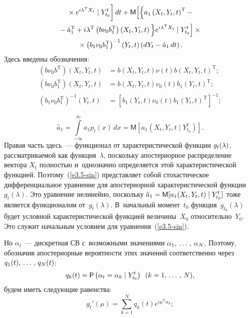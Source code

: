 \begin{multicols}{2}
\begin{multline}
\left.{}\times
    e^{i\lambda^{\mathrm{T}} X_t}\mid Y_{t_0}^t
    \vphantom{\fr{1}{2}}
    \right] dt+ \mathsf{M} \Big[ \Big\{ 
    a_1 \left(X_t,Y_t,t\right)^{\mathrm{T}} -{}\\
    {}-{\hat a}_1^{\mathrm{T}} +i\lambda^{\mathrm{T}} \left(b\nu_0 b^{\mathrm{T}}_1\right)
    \left(X_t,Y_t,t\right)\Big\} e^{i\lambda^{\mathrm{T}} X_t}\mid
    Y_{t_0}^t\Big] \times{}\\
    {}\times \left(b_1\nu_0 b_1^{\mathrm{T}}\right)^{-1} (Y_t,t) \left(dY_t-{\hat a}_1
    \,dt\right).\label{e3.5-sin}
    \end{multline}
Здесь введены обозначения:
\begin{align*}
\left(b\nu_0 b^{\mathrm{T}}\right)\left(X_t,Y_t,t\right)& = b\left(X_t,Y_t,t\right) \nu(t) b\left(X_t,Y_t,t\right)^{\mathrm{T}};\\
     \left(b\nu_0 b_1^{\mathrm{T}}\right) \left(X_t,Y_t,t\right) &=b\left(X_t,Y_t,t\right) \nu_0(t)
    b_1 \left(Y_t,t\right)^{\mathrm{T}};
    \\
     \left(b_1\nu_0 b_1^{\mathrm{T}}\right)^{-1} \left(Y_t,t\right) &=\left[b_1 \left(Y_t,t\right) \nu_0(t)
    b_1\left(Y_t,t\right)^{\mathrm{T}}\right]^{-1};
   \end{align*}
   
   \vspace*{-9pt}
   
\noindent
   $$
    {\hat a}_1 =\int\limits_{-\infty}^\infty a_1 p_t (x) \,dx= \mathsf{M}\left[a_1 \left(X_t, Y_t,t\mid
    Y_{t_0}^t\right)\right].
$$
Правая часть здесь~--- функционал от характеристической функции
$g_t(\lambda)$, рассматриваемой как функция~$\lambda$, поскольку
апостериорное распределение вектора  $X_t$ полностью и~однозначно
определяется этой характеристической функцией. Поэтому~(\ref{e3.5-sin})
представляет собой стохастическое дифференциальное уравнение для
апостериорной характеристической функции~$g_t(\lambda)$. Это уравнение
нелинейно, поскольку  ${\hat a}_1\hm= \mathsf{M}
[a_1 (X_t,Y_t,t)\mid Y_{t_0}^t]$ тоже является функционалом
от~$g_t (\lambda)$. В~начальный момент~$t_0$ функция~$g_{t_0} (\lambda)$
будет условной характеристической функцией величины~$X_0$
 относительно~$Y_0$. Это служит начальным условием для уравнения~(\ref{e3.5-sin}).

Но  $\alpha_t$~--- дискретная СВ с~возможными
значениями  $\alpha_1,\,\ldots\,,\,\alpha_N$. Поэтому, обозначив
апостериорные вероятности этих значений соответственно через
$q_1(t) ,\,\ldots\,,\, q_N (t)$:
       \begin{equation}
    q_k (t) = \mathsf{P} \left(\alpha_t =\alpha_k \mid Y_{t_0}^t \right) \enskip (k=1,\,\ldots\,,\, N),
    \label{e3.7-sin}
    \end{equation}
будем иметь следующие равенства:
    \begin{equation}
    g_t' (\mu) = \sum\limits_{k=1}^N q_k (t)
    e^{i\mu^{\mathrm{T}}\alpha_k};\label{e3.8-sin}
    \end{equation}
    

\end{multicols}
